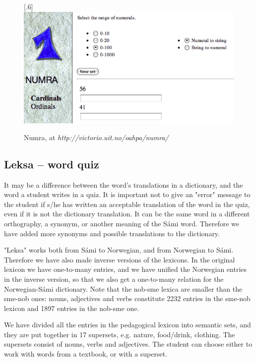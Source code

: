 \documentclass[a4paper,12pt]{article}
\begin{document}
\begin{figure}[htbp]
\begin{center}
\scalebox{.6}[.6]{\includegraphics{img/numra.png}}\\
\caption{Numra, at \textit{http://victorio.uit.no/oahpa/numra/}}
\label{numra}
\end{center}
\end{figure}

\subsection{Leksa -- word quiz}
It may be a difference between the word's translations in a dictionary, and the word a student writes in a quiz. It is important not to give an "error" message to the student if s/he has written an acceptable translation of the word in the quiz, even if it is not the dictionary translation. It can be the same word in a different orthography, a synonym, or another meaning of the Sámi word. Therefore we have added more synonyms and possible translations to the dictionary.

"Leksa" works both from Sámi to Norwegian, and from Norwegian to Sámi. Therefore we have also made inverse versions of the lexicons. In the original lexicon we have one-to-many entries, and we have unified the Norwegian entries in the inverse version, so that we also get a one-to-many relation for the Norwegian-Sámi dictionary. Note that the nob-sme lexica are smaller than the sme-nob ones: nouns, adjectives and verbs constitute 2232 entries in the sme-nob lexicon and 1897 entries in the nob-sme one.

We have divided all the entries in the pedagogical lexicon into semantic sets, and they are put together in 17 supersets, e.g. nature, food/drink, clothing. The supersets consist of nouns, verbs and adjectives. The student can choose either to work with words from a textbook, or with a superset. 
\vspace{0.5cm}
\end{document}
